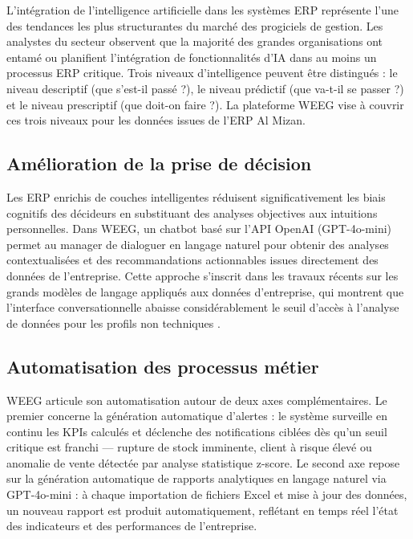 \documentclass[a4paper,12pt]{report}
\begin{document}
L'intégration de l'intelligence artificielle dans les systèmes ERP représente
l'une des tendances les plus structurantes du marché des progiciels de gestion.
Les analystes du secteur observent que la majorité des grandes organisations ont
entamé ou planifient l'intégration de fonctionnalités d'IA dans au moins un
processus ERP critique. Trois niveaux d'intelligence peuvent être distingués : le
niveau descriptif (que s'est-il passé ?), le niveau prédictif (que va-t-il se
passer ?) et le niveau prescriptif (que doit-on faire ?). La plateforme WEEG vise
à couvrir ces trois niveaux pour les données issues de l'ERP Al Mizan.

\subsection{Amélioration de la prise de décision}

Les ERP enrichis de couches intelligentes réduisent significativement les biais
cognitifs des décideurs en substituant des analyses objectives aux intuitions
personnelles. Dans WEEG, un chatbot basé sur l'API OpenAI (GPT-4o-mini) permet
au manager de dialoguer en langage naturel pour obtenir des analyses
contextualisées et des recommandations actionnables issues directement des données
de l'entreprise. Cette approche s'inscrit dans les travaux récents sur les grands
modèles de langage appliqués aux données d'entreprise, qui montrent que
l'interface conversationnelle abaisse considérablement le seuil d'accès à
l'analyse de données pour les profils non techniques \cite{A6}.

\subsection{Automatisation des processus métier}

WEEG articule son automatisation autour de deux axes complémentaires. Le premier concerne la génération automatique d'alertes : le système surveille en continu les KPIs calculés et déclenche des notifications ciblées dès qu'un seuil critique est franchi — rupture de stock imminente, client à risque élevé ou anomalie de vente détectée par analyse statistique z-score. Le second axe repose sur la génération automatique de rapports analytiques en langage naturel via GPT-4o-mini : à chaque importation de fichiers Excel et mise à jour des données, un nouveau rapport est produit automatiquement, reflétant en temps réel l'état des indicateurs et des performances de l'entreprise.
\end{document}
